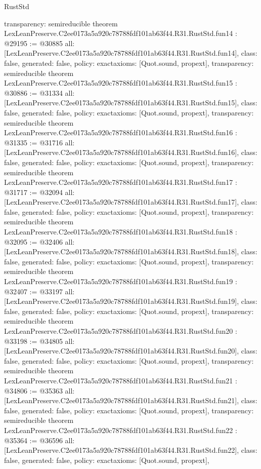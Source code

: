 \begin{lexlean}{RustStd}
\begin{coremodule}
{  transparency: semireducible
}
theorem LexLeanPreserve.C2ee0173a5a920c78788fdf101ab63f44.R31.RustStd.fun14 : @29195 := @30885 {
  all: [LexLeanPreserve.C2ee0173a5a920c78788fdf101ab63f44.R31.RustStd.fun14],
  class: false,
  generated: false,
  policy: exact{axioms: [Quot.sound, propext]},
  transparency: semireducible
}
theorem LexLeanPreserve.C2ee0173a5a920c78788fdf101ab63f44.R31.RustStd.fun15 : @30886 := @31334 {
  all: [LexLeanPreserve.C2ee0173a5a920c78788fdf101ab63f44.R31.RustStd.fun15],
  class: false,
  generated: false,
  policy: exact{axioms: [Quot.sound, propext]},
  transparency: semireducible
}
theorem LexLeanPreserve.C2ee0173a5a920c78788fdf101ab63f44.R31.RustStd.fun16 : @31335 := @31716 {
  all: [LexLeanPreserve.C2ee0173a5a920c78788fdf101ab63f44.R31.RustStd.fun16],
  class: false,
  generated: false,
  policy: exact{axioms: [Quot.sound, propext]},
  transparency: semireducible
}
theorem LexLeanPreserve.C2ee0173a5a920c78788fdf101ab63f44.R31.RustStd.fun17 : @31717 := @32094 {
  all: [LexLeanPreserve.C2ee0173a5a920c78788fdf101ab63f44.R31.RustStd.fun17],
  class: false,
  generated: false,
  policy: exact{axioms: [Quot.sound, propext]},
  transparency: semireducible
}
theorem LexLeanPreserve.C2ee0173a5a920c78788fdf101ab63f44.R31.RustStd.fun18 : @32095 := @32406 {
  all: [LexLeanPreserve.C2ee0173a5a920c78788fdf101ab63f44.R31.RustStd.fun18],
  class: false,
  generated: false,
  policy: exact{axioms: [Quot.sound, propext]},
  transparency: semireducible
}
theorem LexLeanPreserve.C2ee0173a5a920c78788fdf101ab63f44.R31.RustStd.fun19 : @32407 := @33197 {
  all: [LexLeanPreserve.C2ee0173a5a920c78788fdf101ab63f44.R31.RustStd.fun19],
  class: false,
  generated: false,
  policy: exact{axioms: [Quot.sound, propext]},
  transparency: semireducible
}
theorem LexLeanPreserve.C2ee0173a5a920c78788fdf101ab63f44.R31.RustStd.fun20 : @33198 := @34805 {
  all: [LexLeanPreserve.C2ee0173a5a920c78788fdf101ab63f44.R31.RustStd.fun20],
  class: false,
  generated: false,
  policy: exact{axioms: [Quot.sound, propext]},
  transparency: semireducible
}
theorem LexLeanPreserve.C2ee0173a5a920c78788fdf101ab63f44.R31.RustStd.fun21 : @34806 := @35363 {
  all: [LexLeanPreserve.C2ee0173a5a920c78788fdf101ab63f44.R31.RustStd.fun21],
  class: false,
  generated: false,
  policy: exact{axioms: [Quot.sound, propext]},
  transparency: semireducible
}
theorem LexLeanPreserve.C2ee0173a5a920c78788fdf101ab63f44.R31.RustStd.fun22 : @35364 := @36596 {
  all: [LexLeanPreserve.C2ee0173a5a920c78788fdf101ab63f44.R31.RustStd.fun22],
  class: false,
  generated: false,
  policy: exact{axioms: [Quot.sound, propext]},
}
\end{coremodule}
\end{lexlean}
